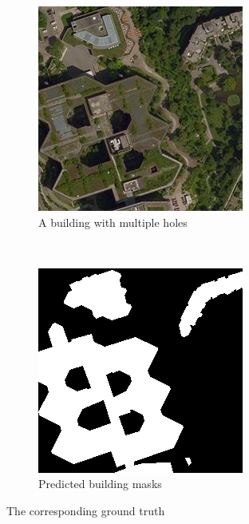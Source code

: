 \begin{figure}[H]
	\centering
	\begin{subfigure}{0.4\textwidth}
		\centering
    	\includegraphics[width=0.9\linewidth]{chapters/theoretical_and_experimental_results/images/building_with_hole.png}		    \caption{A building with multiple holes}
	\end{subfigure}~
		\begin{subfigure}{0.4\textwidth}
		\centering
    	\includegraphics[width=0.9\linewidth]{chapters/theoretical_and_experimental_results/images/building_with_hole_gt.png}		    \caption{Predicted building masks}
	\end{subfigure}
	\caption{The corresponding ground truth}
	\label{fig:results:buildings_with_holes_gt}
\end{figure}


